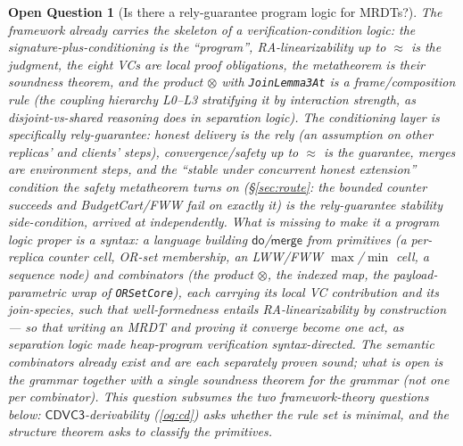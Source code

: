 \documentclass[11pt]{article}
\newtheorem{openq}[theorem]{Open Question}
\newcommand{\cd}{\mathsf{CDVC3}}
\newcommand{\lean}[1]{\texttt{#1}}
\newcommand{\dodo}{\mathsf{do}}
\newcommand{\merge}{\mathsf{merge}}
\newcommand{\eqobs}{\approx}
\begin{document}
\begin{openq}[Is there a rely-guarantee program logic for MRDTs?]
\label{oq:proglogic}
The framework already carries the skeleton of a verification-condition logic:
the signature-plus-conditioning is the ``program'', RA-linearizability up to
$\eqobs$ is the judgment, the eight VCs are local proof obligations, the
metatheorem is their \emph{soundness theorem}, and the product $\otimes$ with
\lean{JoinLemma3At} is a frame/composition rule (the coupling hierarchy
L0--L3 stratifying it by interaction strength, as disjoint-vs-shared
reasoning does in separation logic). The conditioning layer is specifically
\emph{rely-guarantee}: honest delivery is the \emph{rely} (an assumption on
other replicas' and clients' steps), convergence/safety up to $\eqobs$ is the
\emph{guarantee}, merges are environment steps, and the ``stable under
concurrent honest extension'' condition the safety metatheorem turns on
(\S\ref{sec:route}: the bounded counter succeeds and
BudgetCart/FWW fail on exactly it) \emph{is} the rely-guarantee stability
side-condition, arrived at independently. What is missing to make it a
program logic proper is a \emph{syntax}: a language building $\dodo$/$\merge$
from primitives (a per-replica counter cell, OR-set membership, an LWW/FWW
$\max$/$\min$ cell, a sequence node) and combinators (the product $\otimes$,
the indexed map, the payload-parametric wrap of \lean{ORSetCore}), each
carrying its local VC contribution and its join-species, such that
well-formedness entails RA-linearizability \emph{by construction} --- so that
writing an MRDT and proving it converge become one act, as separation logic
made heap-program verification syntax-directed. The \emph{semantic}
combinators already exist and are each \emph{separately} proven sound; what
is open is the grammar together with a \emph{single} soundness theorem for
the grammar (not one per combinator). This question subsumes the two
framework-theory questions below: $\cd$-derivability (\ref{oq:cd}) asks
whether the rule set is minimal, and the structure theorem asks to classify
the primitives.
\end{openq}
\end{document}
